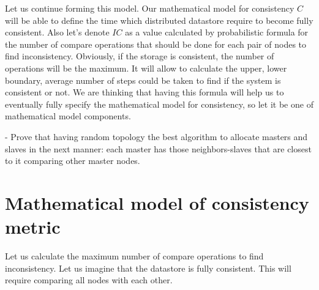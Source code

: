\documentclass{llncs}
\begin{document}
Let us continue forming this model.
Our mathematical model for consistency $C$ will be able to define the time which distributed datastore require
to become fully consistent. Also let's denote  $IC$ as a value calculated by probabilistic formula for the number of compare operations that should be done for each pair of nodes to find inconsistency.
Obviously, if the storage is consistent, the number of operations will be the maximum. It will allow to calculate the upper, lower boundary, average number of steps could be taken to find if the system is consistent or not.
We are thinking that having this formula will help us to eventually fully specify the mathematical model for consistency, so let it be one of mathematical model components.






- Prove that having random topology the best algorithm to allocate masters and slaves
in the next manner: each master has those neighbors-slaves that are closest to it comparing
other master nodes.

\section{Mathematical model of consistency metric}

Let us calculate the maximum number of compare operations to find inconsistency. Let us imagine that the datastore is fully consistent. This will require comparing all nodes with each other.
\end{document}
